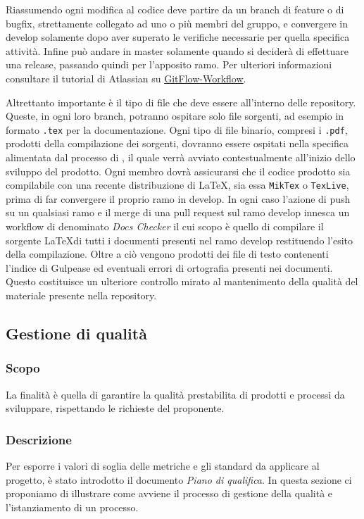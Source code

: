 Riassumendo ogni modifica al codice deve partire da un branch di feature o di bugfix, strettamente collegato ad uno o più membri del gruppo, e convergere in develop solamente dopo
aver superato le verifiche necessarie per quella specifica attività.
Infine può andare in master solamente quando si deciderà di effettuare una release, passando quindi per l'apposito ramo.
Per ulteriori informazioni consultare il tutorial di Atlassian su \href{https://www.atlassian.com/git/tutorials/comparing-workflows/gitflow-workflow}{GitFlow-Workflow}.

Altrettanto importante è il tipo di file che deve essere all'interno delle repository. Queste, in ogni loro branch, potranno ospitare solo file sorgenti, ad esempio
in formato \verb|.tex| per la documentazione. Ogni tipo di file binario, compresi i \verb|.pdf|, prodotti della compilazione dei sorgenti, dovranno essere
ospitati nella specifica \textit{} alimentata dal processo di \textit{}, il quale verrà avviato contestualmente
all'inizio dello sviluppo del prodotto. Ogni membro dovrà assicurarsi che il codice prodotto sia compilabile con una recente distribuzione di \LaTeX,
sia essa \verb|MikTex| o \verb|TexLive|, prima di far convergere il proprio ramo in develop. In ogni caso l'azione di push su un qualsiasi ramo e il merge di una pull request sul ramo develop
innesca un workflow di  denominato \textit{Docs Checker} il cui scopo è quello di compilare il sorgente \LaTeX di tutti i documenti presenti nel ramo develop
restituendo l'esito della compilazione. Oltre a ciò vengono prodotti dei file di testo contenenti l'indice di Gulpease ed eventuali errori di ortografia presenti nei documenti.
Questo costituisce un ulteriore controllo mirato al mantenimento della qualità del materiale presente nella repository.

\subsection{Gestione di qualità} \label{_gestioneDiQualita}

\subsubsection{Scopo}
La finalità è quella di garantire la qualità prestabilita di prodotti e processi da sviluppare, rispettando le richieste del proponente.

\subsubsection{Descrizione}
Per esporre i valori di soglia delle metriche e gli standard da applicare al progetto, è stato introdotto il documento \textit{Piano di qualifica}.
In questa sezione ci proponiamo di illustrare come avviene il processo di gestione della qualità e l'istanziamento di un processo.

